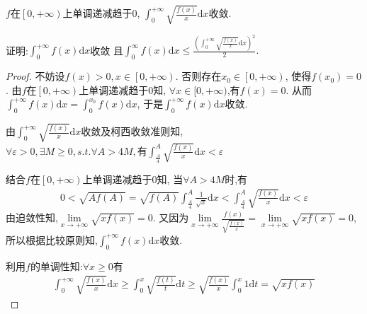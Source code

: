 \documentclass[lang=cn,newtx,10pt,scheme=chinese]{../Template/elegantbook}
\begin{document}
\begin{example}
$f$在$\left[ 0,+\infty \right) $上单调递减趋于0,
$\int_0^{+\infty}{\sqrt{\frac{f(x)}{x}}\mathrm{d}x}$收敛.

证明:$\int_0^{+\infty}{f\left( x \right) \mathrm{d}x}$收敛
且$\int_0^{\infty}{f\left( x \right) \mathrm{d}x}\leqslant \frac{\left( \int_0^{+\infty}{\sqrt{\frac{f\left( x \right)}{x}}\mathrm{d}x} \right) ^2}{2}.$
\begin{proof}
不妨设$f(x)>0,x\in \left[ 0,+\infty \right)$.
否则存在$x_0\in \left[ 0,+\infty \right)$,
使得$f\left( x_0 \right) =0$.
由$f$在$\left[ 0,+\infty \right) $上单调递减趋于0知,
$ \forall x\in [0,+\infty)$,有$f(x)=0$.
从而$\int_0^{+\infty}{f\left( x \right) \mathrm{d}x}=\int_0^{x_0}{f\left( x \right) \mathrm{d}x}$,
于是$\int_0^{+\infty}{f\left( x \right) \mathrm{d}x}$收敛.

由$\int_0^{+\infty}{\sqrt{\frac{f(x)}{x}}\mathrm{d}x}$收敛及柯西收敛准则知,
$\forall \varepsilon>0,\exists M\geqslant 0,s.t. \forall A>4M,\text{有}
\int_{\frac{A}{4}}^A{\sqrt{\frac{f(x)}{x}}\mathrm{d}x}<\varepsilon$

结合$f$在$\left[ 0,+\infty \right) $上单调递减趋于0知,
当$\forall A>4M$时,有
\begin{equation}
\begin{split}
0<\sqrt{Af(A)}=\sqrt{f(A)}\int_{\frac{A}{4}}^A{\frac{1}{\sqrt{x}}\mathrm{d}x<}\int_{\frac{A}{4}}^A{\sqrt{\frac{f(x)}{x}}\mathrm{d}x<}\varepsilon 
\end{split}
\nonumber
\end{equation}
由迫敛性知,$\underset{x\rightarrow +\infty}{\lim}\sqrt{xf(x)}=0$.
又因为$\underset{x\rightarrow +\infty}{\lim}\frac{f(x)}{\sqrt{\frac{f(x)}{x}}}=\underset{x\rightarrow +\infty}{\lim}\sqrt{xf(x)}=0$,
所以根据比较原则知,$\int_0^{+\infty}{f\left( x \right) \mathrm{d}x}$收敛.

利用$f$的单调性知:$\forall x \geqslant 0$有
\begin{equation}
\begin{split}
\int_0^{+\infty}{\sqrt{\frac{f(x)}{x}}\mathrm{d}x}\geqslant \int_0^x{\sqrt{\frac{f(t)}{t}}\mathrm{d}t}\geqslant \sqrt{\frac{f(x)}{x}}\int_0^x{1\mathrm{d}t}=\sqrt{xf\left( x \right)}
\end{split}
\nonumber
\end{equation}


\end{proof}
\end{example}
\end{document}
